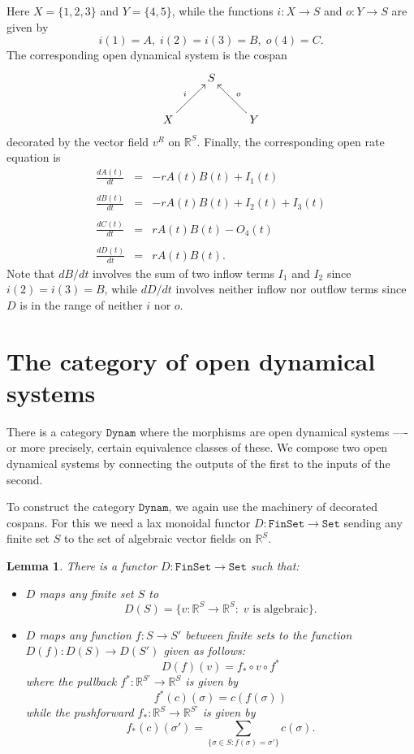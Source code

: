 \documentclass{compositionalityarticle}
\newcommand{\R}{\mathbb{R}}
\newcommand{\FinSet}{\mathtt{FinSet}}
\newcommand{\Set}{\mathtt{Set}}
\newcommand{\Dynam}{\mathtt{Dynam}}
\newcommand{\maps}{\colon}
\theoremstyle{plain}
\newtheorem{lem}[thm]{Lemma}
\theoremstyle{remark}
\begin{document}
Here $X = \{1,2,3\}$ and $Y = \{4,5\}$, while the functions $i \maps X \to S$ and $o \maps Y \to S$ are given by
\[      i(1) = A, \; i(2) = i(3) = B, \; o(4) = C. \]
The corresponding open dynamical system is the cospan
\[ \xymatrix{  & S  &  \\ X \ar[ur]^{i} & & Y \ar[ul]_{o} } \]
decorated by the vector field $v^R$ on $\R^S$.   Finally, the corresponding open rate equation is
\[ 
\begin{array}{rcl} 
\displaystyle{\frac{dA(t)}{dt}} &=& - r A(t) B(t)  + I_1(t)\\ \\
\displaystyle{\frac{dB(t)}{dt}} &=& - r A(t) B(t) + I_2(t) + I_3(t) \\ \\
\displaystyle{\frac{dC(t)}{dt}} &=& r A(t) B(t) - O_4(t) \\ \\
\displaystyle{\frac{dD(t)}{dt}} &=& r A(t) B(t).
\end{array}
\]
Note that $dB/dt$ involves the sum of two inflow terms $I_1$ and $I_2$ 
since $i(2) = i(3) = B$, while $dD/dt$ involves neither inflow nor outflow terms 
since $D$ is in the range of neither $i$ nor $o$.  

\section{The category of open dynamical systems}
\label{sec:opendynam}

There is a category $\Dynam$ where the morphisms are open dynamical systems ----or more precisely, certain equivalence classes of these.  We compose two open dynamical systems by connecting the outputs of the first to the inputs of the second.  

To construct the category $\Dynam$, we again use the machinery of decorated cospans.  
For this we need a lax monoidal functor $D \maps \FinSet \to \Set$ sending any finite set $S$ to the set of algebraic vector fields on $\R^S$.

\begin{lem}
\label{lemma:Dfunctor}
There is a functor $D \maps \FinSet \to \Set$ such that:
\begin{itemize}
\item $D$ maps any finite set $S$ to 
\[ D(S) = \{ v \maps \R^S \to \R^S : \; v \textrm{ is algebraic}  \}. \] 
\item $D$ maps any function $f \maps S \to S'$ between finite sets to the function $D(f) \maps D(S) \to D(S')$ given as follows:
\[ D(f)(v) = f_* \circ v \circ f^* \]
where the pullback $ f^* \maps \R^{S'} \to \R^S $ is given by
\[ f^*(c)(\sigma) = c(f(\sigma)) \] 
while the pushforward $ f_* \maps \R^{S} \to \R^{S'} $ is given by
\[ f_*(c)(\sigma') = \sum_{ \{ \sigma \in S : f(\sigma) = \sigma' \} } c(\sigma). \]
\end{itemize}
\end{lem}
\end{document}
